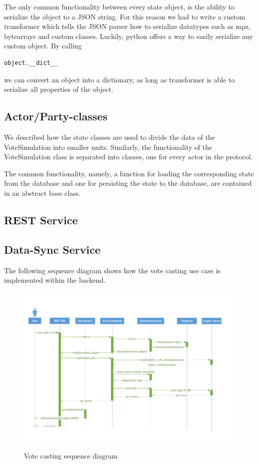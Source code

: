 
The only common functionality between every state object, is the ability to serialize the object to a JSON string. For this reason we had to write a custom transformer which tells the JSON parser how to serialize datatypes such as mpz, bytearrays and custom classes. Luckily, python offers a way to easily serialize any custom object. By calling \begin{verbatim}object.__dict__\end{verbatim} we can convert an object into a dictionary, as long as transformer is able to serialize all properties of the object.

\subsection{Actor/Party-classes}
We described how the state classes are used to divide the data of the VoteSimulation into smaller units. Similarly, the functionality of the VoteSimulation class is separated into classes, one for every actor in the protocol.


The common functionality, namely, a function for loading the corresponding state from the database and one for persisting the state to the database, are contained in an abstract base class.

\subsection{REST Service}
\subsection{Data-Sync Service}

The following sequence diagram shows how the vote casting use case is implemented within the backend.
\begin{figure}[h!]
\begin{center}
\includegraphics[scale=0.65]{assets/votecastingDiagram.pdf}\\
\caption{Vote casting sequence diagram}
\end{center}
\end{figure}

